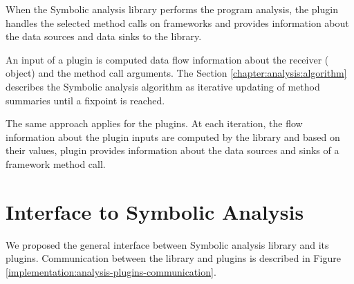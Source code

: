 When the Symbolic analysis library performs the program analysis,
the plugin handles the selected method calls on frameworks and provides
information about the data sources and data sinks to the library.

An input of a plugin is computed data flow information
about the receiver ( object) and the method call arguments.
The Section \ref{chapter:analysis:algorithm} describes the Symbolic analysis algorithm
as iterative updating of method summaries until a fixpoint is reached.

The same approach applies for the plugins. At each iteration, the flow information
about the plugin inputs are computed by the library and based on their values,
plugin provides information about the data sources and sinks of a framework method call.




\section{Interface to Symbolic Analysis \label{chapter:implementation:interface}}

We proposed the general interface between Symbolic analysis library and its plugins.
Communication between the library and plugins is described in
Figure \ref{implementation:analysis-plugins-communication}.

